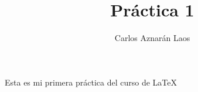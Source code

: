 \documentclass[12pt,a4paper]{article}
\author{Carlos Aznarán Laos}
\title{Práctica 1}
\begin{document}
\maketitle
Esta es mi primera práctica del curso de  \LaTeX
\end{document}

